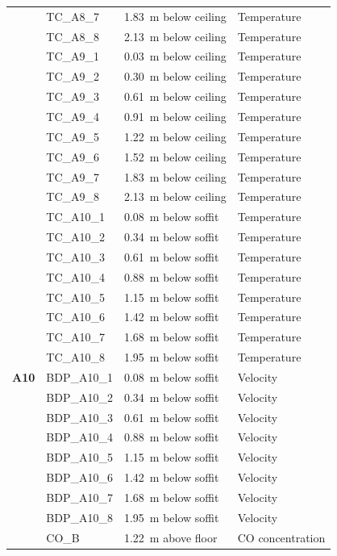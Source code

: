 \documentclass[12pt,oneside]{book}
\begin{document}
\begin{longtable}[c]{c|lll}
 & TC\_A8\_7  & 1.83~m below ceiling & Temperature \\
 & TC\_A8\_8  & 2.13~m below ceiling & Temperature \\
\bottomrule
\newpage
\multirow{8}{*}{\large{\textbf{A9}}}
 & TC\_A9\_1  & 0.03~m below ceiling & Temperature \\
 & TC\_A9\_2  & 0.30~m below ceiling & Temperature \\
 & TC\_A9\_3  & 0.61~m below ceiling & Temperature \\
 & TC\_A9\_4  & 0.91~m below ceiling & Temperature \\
 & TC\_A9\_5  & 1.22~m below ceiling & Temperature \\
 & TC\_A9\_6  & 1.52~m below ceiling & Temperature \\
 & TC\_A9\_7  & 1.83~m below ceiling & Temperature \\
 & TC\_A9\_8  & 2.13~m below ceiling & Temperature \\
\midrule
\multirow{19}{*}{\large\textbf{A10}} 
 & TC\_A10\_1  & 0.08~m below soffit  & Temperature \\
 & TC\_A10\_2  & 0.34~m below soffit  & Temperature \\
 & TC\_A10\_3  & 0.61~m below soffit  & Temperature \\
 & TC\_A10\_4  & 0.88~m below soffit  & Temperature \\
 & TC\_A10\_5  & 1.15~m below soffit  & Temperature \\
 & TC\_A10\_6  & 1.42~m below soffit  & Temperature \\
 & TC\_A10\_7  & 1.68~m below soffit  & Temperature \\
 & TC\_A10\_8  & 1.95~m below soffit  & Temperature \\
\cline{2-4}
 & BDP\_A10\_1 & 0.08~m below soffit  & Velocity \\
 & BDP\_A10\_2 & 0.34~m below soffit  & Velocity \\
 & BDP\_A10\_3 & 0.61~m below soffit  & Velocity \\
 & BDP\_A10\_4 & 0.88~m below soffit  & Velocity \\
 & BDP\_A10\_5 & 1.15~m below soffit  & Velocity \\
 & BDP\_A10\_6 & 1.42~m below soffit  & Velocity \\
 & BDP\_A10\_7 & 1.68~m below soffit  & Velocity \\
 & BDP\_A10\_8 & 1.95~m below soffit  & Velocity \\
\cline{2-4}
 & CO\_B      & 1.22~m above floor   & CO concentration \\

\end{longtable}
\end{document}
